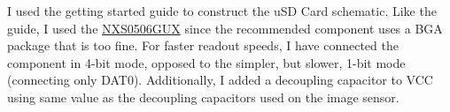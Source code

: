I used the getting started guide to construct the uSD Card schematic. Like the guide, I used the \href{https://au.mouser.com/ProductDetail/Nexperia/NXS0506GUX?qs=mELouGlnn3dJ4MXFP%2FlneA%3D%3D&srsltid=AfmBOoq__LF323ZMhiJBtt4tLQK1fKdHaHOFdmzJQE47FNIF2Kj_ja8B}{NXS0506GUX} since the recommended component uses a BGA package that is too fine.
\nl
For faster readout speeds, I have connected the component in 4-bit mode, opposed to the simpler, but slower, 1-bit mode (connecting only DAT0).
\nl
Additionally, I added a decoupling capacitor to VCC using same value as the decoupling capacitors used on the image sensor.

